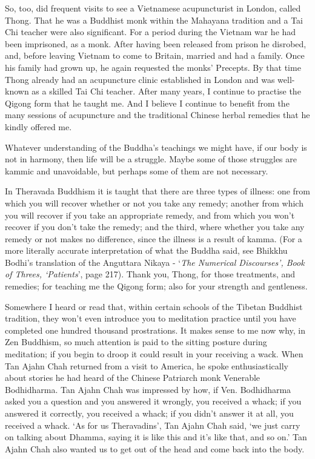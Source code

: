 So, too, did frequent visits to see a Vietnamese acupuncturist in
London, called Thong. That he was a Buddhist monk within the Mahayana
tradition and a Tai Chi teacher were also significant. For a period
during the Vietnam war he had been imprisoned, as a monk. After having
been released from prison he disrobed, and, before leaving Vietnam to
come to Britain, married and had a family. Once his family had grown up,
he again requested the monks' Precepts. By that time Thong already had
an acupuncture clinic established in London and was well-known as a
skilled Tai Chi teacher. After many years, I continue to practise the
Qigong form that he taught me. And I believe I continue to benefit from
the many sessions of acupuncture and the traditional Chinese herbal
remedies that he kindly offered me.

Whatever understanding of the Buddha's teachings we might have, if our
body is not in harmony, then life will be a struggle. Maybe some of
those struggles are kammic and unavoidable, but perhaps some of them are
not necessary.

In Theravada Buddhism it is taught that there are three types of
illness: one from which you will recover whether or not you take any
remedy; another from which you will recover if you take an appropriate
remedy, and from which you won't recover if you don't take the remedy;
and the third, where whether you take any remedy or not makes no
difference, since the illness is a result of kamma. (For a more
literally accurate interpretation of what the Buddha said, see Bhikkhu
Bodhi's translation of the Anguttara Nikaya - `\emph{The Numerical
Discourses', Book of Threes, `Patients}', page 217). Thank you, Thong,
for those treatments, and remedies; for teaching me the Qigong form;
also for your strength and gentleness.

Somewhere I heard or read that, within certain schools of the Tibetan
Buddhist tradition, they won't even introduce you to meditation practice
until you have completed one hundred thousand prostrations. It makes
sense to me now why, in Zen Buddhism, so much attention is paid to the
sitting posture during meditation; if you begin to droop it could result
in your receiving a wack. When Tan Ajahn Chah returned from a visit to
America, he spoke enthusiastically about stories he had heard of the
Chinese Patriarch monk Venerable Bodhidharma. Tan Ajahn Chah was
impressed by how, if Ven. Bodhidharma asked you a question and you
answered it wrongly, you received a whack; if you answered it correctly,
you received a whack; if you didn't answer it at all, you received a
whack. `As for us Theravadins', Tan Ajahn Chah said, `we just carry on
talking about Dhamma, saying it is like this and it's like that, and so
on.' Tan Ajahn Chah also wanted us to get out of the head and come back
into the body.

